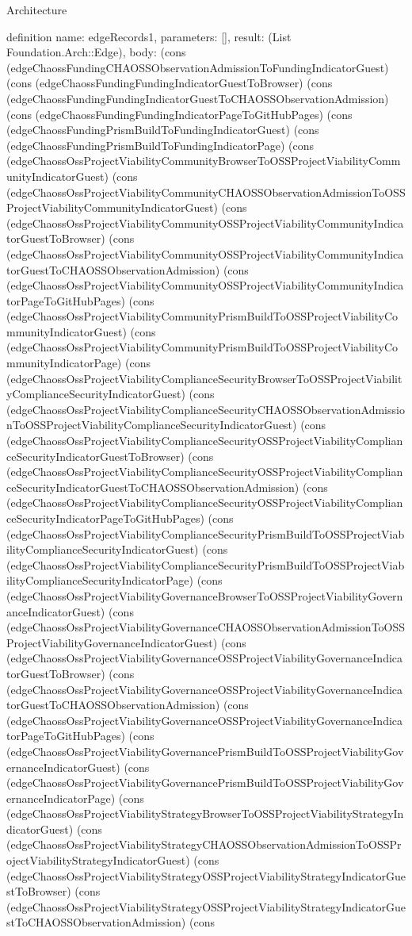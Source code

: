 \begin{lexlean}{Architecture}
\begin{semanticmodule}
definition{
  name: edgeRecords1,
  parameters: [],
  result: (List Foundation.Arch::Edge),
  body: (cons (edgeChaossFundingCHAOSSObservationAdmissionToFundingIndicatorGuest) (cons (edgeChaossFundingFundingIndicatorGuestToBrowser) (cons (edgeChaossFundingFundingIndicatorGuestToCHAOSSObservationAdmission) (cons (edgeChaossFundingFundingIndicatorPageToGitHubPages) (cons (edgeChaossFundingPrismBuildToFundingIndicatorGuest) (cons (edgeChaossFundingPrismBuildToFundingIndicatorPage) (cons (edgeChaossOssProjectViabilityCommunityBrowserToOSSProjectViabilityCommunityIndicatorGuest) (cons (edgeChaossOssProjectViabilityCommunityCHAOSSObservationAdmissionToOSSProjectViabilityCommunityIndicatorGuest) (cons (edgeChaossOssProjectViabilityCommunityOSSProjectViabilityCommunityIndicatorGuestToBrowser) (cons (edgeChaossOssProjectViabilityCommunityOSSProjectViabilityCommunityIndicatorGuestToCHAOSSObservationAdmission) (cons (edgeChaossOssProjectViabilityCommunityOSSProjectViabilityCommunityIndicatorPageToGitHubPages) (cons (edgeChaossOssProjectViabilityCommunityPrismBuildToOSSProjectViabilityCommunityIndicatorGuest) (cons (edgeChaossOssProjectViabilityCommunityPrismBuildToOSSProjectViabilityCommunityIndicatorPage) (cons (edgeChaossOssProjectViabilityComplianceSecurityBrowserToOSSProjectViabilityComplianceSecurityIndicatorGuest) (cons (edgeChaossOssProjectViabilityComplianceSecurityCHAOSSObservationAdmissionToOSSProjectViabilityComplianceSecurityIndicatorGuest) (cons (edgeChaossOssProjectViabilityComplianceSecurityOSSProjectViabilityComplianceSecurityIndicatorGuestToBrowser) (cons (edgeChaossOssProjectViabilityComplianceSecurityOSSProjectViabilityComplianceSecurityIndicatorGuestToCHAOSSObservationAdmission) (cons (edgeChaossOssProjectViabilityComplianceSecurityOSSProjectViabilityComplianceSecurityIndicatorPageToGitHubPages) (cons (edgeChaossOssProjectViabilityComplianceSecurityPrismBuildToOSSProjectViabilityComplianceSecurityIndicatorGuest) (cons (edgeChaossOssProjectViabilityComplianceSecurityPrismBuildToOSSProjectViabilityComplianceSecurityIndicatorPage) (cons (edgeChaossOssProjectViabilityGovernanceBrowserToOSSProjectViabilityGovernanceIndicatorGuest) (cons (edgeChaossOssProjectViabilityGovernanceCHAOSSObservationAdmissionToOSSProjectViabilityGovernanceIndicatorGuest) (cons (edgeChaossOssProjectViabilityGovernanceOSSProjectViabilityGovernanceIndicatorGuestToBrowser) (cons (edgeChaossOssProjectViabilityGovernanceOSSProjectViabilityGovernanceIndicatorGuestToCHAOSSObservationAdmission) (cons (edgeChaossOssProjectViabilityGovernanceOSSProjectViabilityGovernanceIndicatorPageToGitHubPages) (cons (edgeChaossOssProjectViabilityGovernancePrismBuildToOSSProjectViabilityGovernanceIndicatorGuest) (cons (edgeChaossOssProjectViabilityGovernancePrismBuildToOSSProjectViabilityGovernanceIndicatorPage) (cons (edgeChaossOssProjectViabilityStrategyBrowserToOSSProjectViabilityStrategyIndicatorGuest) (cons (edgeChaossOssProjectViabilityStrategyCHAOSSObservationAdmissionToOSSProjectViabilityStrategyIndicatorGuest) (cons (edgeChaossOssProjectViabilityStrategyOSSProjectViabilityStrategyIndicatorGuestToBrowser) (cons (edgeChaossOssProjectViabilityStrategyOSSProjectViabilityStrategyIndicatorGuestToCHAOSSObservationAdmission) (cons }
\end{semanticmodule}
\end{lexlean}
